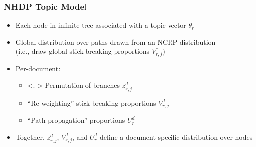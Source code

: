 \begin{frame}
\frametitle{NHDP Topic Model}
\begin{itemize}[<+->]
\item Each node in infinite tree associated with a topic vector $\theta_r$
\item Global distribution over paths drawn from an NCRP distribution \\
    (i.e., draw global stick-breaking proportions $V^*_{r,j}$)
\item Per-document:
    \begin{itemize}[<+->]
    \item<.-> Permutation of branches $z^d_{r,j}$
    \item ``Re-weighting'' stick-breaking proportions $V^d_{r,j}$
    \item ``Path-propagation'' proportions $U^d_r$
    \end{itemize}
\item Together, $z^d_{r,j}$, $V^d_{r,j}$, and $U^d_r$ define a document-specific distribution over nodes
\end{itemize}
\end{frame}


